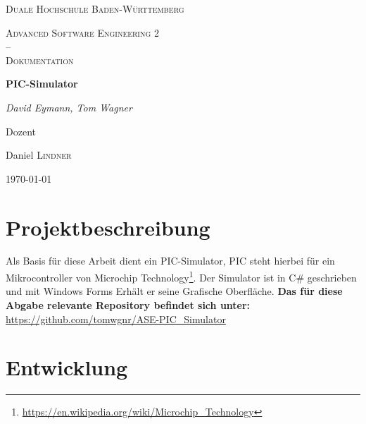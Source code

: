 \documentclass[12pt,a4paper,titlepage,ngerman,pdftex]{report}
\begin{document}
	\begin{titlepage}
		\centering
		{\scshape\LARGE Duale Hochschule Baden-Württemberg \par}
		\vspace{1cm}
		{\scshape\Large Advanced Software Engineering 2 \\--\\ Dokumentation\par}
		\vspace{1.5cm}
		{\huge\bfseries PIC-Simulator\par}
		\vspace{2cm}
		{\Large\itshape David Eymann, Tom Wagner\par}
		\vfill
		Dozent\par
		Daniel \textsc{Lindner}
		
		\vfill
		
		{\large \today\par}
	\end{titlepage}
	
	\tableofcontents
	\listoffigures
	
	\onehalfspacing
	
	\chapter{Projektbeschreibung}\label{ch:projektbeschreibung}
	
	Als Basis für diese Arbeit dient ein PIC-Simulator, PIC steht hierbei für ein Mikrocontroller von Microchip Technology\footnote{\url{https://en.wikipedia.org/wiki/Microchip_Technology}}.
	Der Simulator ist in C\# geschrieben und mit Windows Forms Erhält er seine Grafische Oberfläche.
	\textbf{Das für diese Abgabe relevante Repository befindet sich unter:} \\ \url{https://github.com/tomwgnr/ASE-PIC_Simulator}\\
	
	
	
	
	
	\chapter{Entwicklung}\label{ch:entwicklung}
\end{document}
